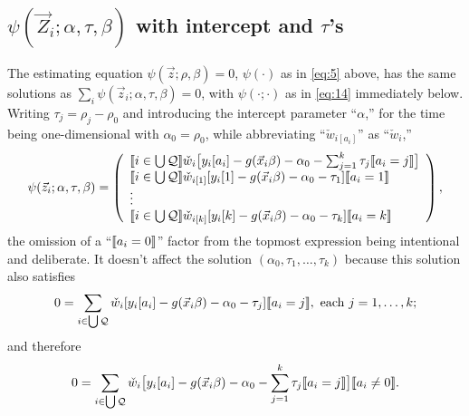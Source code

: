 \documentclass{article}
\DeclarePairedDelimiter{\indicator}{\llbracket}{\rrbracket}
\newcommand{\owt}[1][{[a_i]}]{\ensuremath{\check{w}_{i#1}}}
\begin{document}
\subsection{$\psi(\vec{Z}_{i};
  \alpha, \tau, \beta)$ with intercept and $\tau$'s}
\label{sec:psit-rho_0-tau}

The estimating equation $\psi(\vec{z}; \rho, \beta)=0$,
$\psi(\cdot)$ as in \eqref{eq:5} above, has the same solutions as $\sum_{i}\psi(\vec{z}_{i};
  \alpha, \tau, \beta)=0$, with $\psi(\cdot; \cdot)$ as in \eqref{eq:14} immediately below.  Writing $\tau_{j}=\rho_{j}-\rho_{0}$ and introducing the intercept parameter ``$\alpha$,''  for the time being one-dimensional with $\alpha_{0}=\rho_{0}$, while abbreviating ``$\owt{}$'' as ``$\owt[]$,'' 
\begin{equation} \label{eq:14}
         \psi(\vec{z}_{i};
  \alpha, \tau, \beta) =
         \left( \begin{array}{l}
           \indicator{i \in \bigcup \mathcal{Q}}\owt[] \big[y_{i}[a_{i}] - g(\vec{x}_{i}\beta)-
                  \alpha_{0} - \sum_{j=1}^{k}\tau_{j}\indicator{a_{i}=j}\big]\\
           \indicator{i \in \bigcup \mathcal{Q}}\owt[{[1]}] [y_{i}[1] - g(\vec{x}_{i}\beta)-
                  \alpha_{0}-\tau_{1}]\indicator{a_{i}=1}\\
                  \vdots \\
           \indicator{i \in \bigcup \mathcal{Q}}\owt[{[k]}] [y_{i}[k] - g(\vec{x}_{i}\beta)-
                 \alpha_{0} - \tau_{k}]\indicator{a_{i}=k}\\
                \end{array}\right), 
\end{equation}
the omission of a ``$\indicator{a_{i}=0}$'' factor from the topmost
expression being intentional and deliberate. It doesn't affect the solution
$(\alpha_{0}, \tau_{1}, \ldots, \tau_{k})$ because this solution also satisfies
\begin{equation} \label{eq:16}
       0 = \sum_{i \in \bigcup \mathcal{Q}}\owt[][y_{i}[a_i] - g(\vec{x}_{i}\beta)-
                  \alpha_{0}-\tau_{j}]\indicator{a_{i}=j}, \text{ each } j=1, \ldots, k;
\end{equation}
and therefore
\begin{equation*}
       0 = \sum_{i \in \bigcup \mathcal{Q}}\owt[]\big[y_{i}[a_i] - g(\vec{x}_{i}\beta)-
                  \alpha_{0}-\sum_{j=1}^{k}\tau_{j}\indicator{a_{i}=j}\big]\indicator{a_{i}
                  \neq 0}.
\end{equation*}
\end{document}
